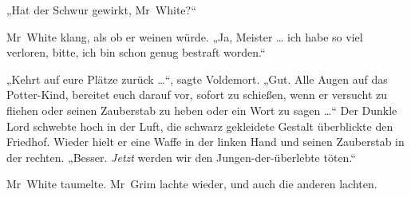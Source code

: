 „Hat der Schwur gewirkt, Mr~White?“

Mr~White klang, als ob er weinen würde.
„Ja, Meister … ich habe so viel verloren, bitte, ich bin schon genug bestraft worden.“

„Kehrt auf eure Plätze zurück …“, sagte Voldemort.
„Gut. Alle Augen auf das Potter-Kind, bereitet euch darauf vor, sofort zu schießen, wenn er versucht zu fliehen oder seinen Zauberstab zu heben oder ein Wort zu sagen …“
Der Dunkle Lord schwebte hoch in der Luft, die schwarz gekleidete Gestalt überblickte den Friedhof. Wieder hielt er eine Waffe in der linken Hand und seinen Zauberstab in der rechten.
„Besser. \emph{Jetzt} werden wir den Jungen-der-überlebte töten.“

Mr~White taumelte. Mr~Grim lachte wieder, und auch die anderen lachten.


